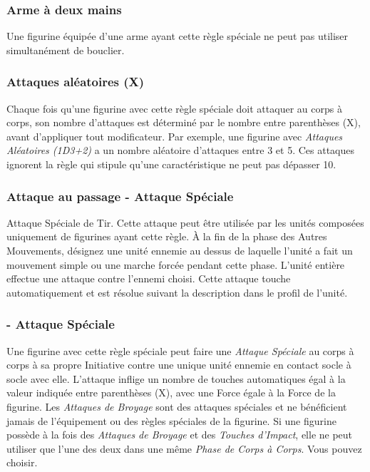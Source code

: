 \subsubsection*{Arme à deux mains}

Une figurine équipée d’une arme ayant cette règle spéciale ne peut pas utiliser simultanément de bouclier.


\subsubsection*{Attaques aléatoires (X)}

Chaque fois qu'une figurine avec cette règle spéciale doit attaquer au corps à corps, son nombre d'attaques est déterminé par le nombre entre parenthèses (X), avant d'appliquer tout modificateur. Par exemple, une figurine avec \emph{Attaques Aléatoires (1D3+2)} a un nombre aléatoire d'attaques entre 3 et 5. Ces attaques ignorent la règle qui stipule qu'une caractéristique ne peut pas dépasser 10.

\subsubsection*{Attaque au passage - Attaque Spéciale}

Attaque Spéciale de Tir. Cette attaque peut être utilisée par les unités composées uniquement de figurines ayant cette règle. À la fin de la phase des Autres Mouvements, désignez une unité ennemie  au dessus de laquelle l'unité a fait un mouvement simple ou une marche forcée pendant cette phase.  L'unité entière effectue une attaque contre l'ennemi choisi. Cette attaque touche automatiquement et est résolue suivant la description dans le profil de l'unité.

\subsubsection*{ - Attaque Spéciale}

Une figurine avec cette règle spéciale peut faire une \emph{Attaque Spéciale} au corps à corps à sa propre Initiative contre une unique unité ennemie en contact socle à socle avec elle. L'attaque inflige un nombre de touches automatiques égal à la valeur indiquée entre parenthèses (X), avec une Force égale à la Force de la figurine. Les \emph{Attaques de Broyage} sont des attaques spéciales et ne bénéficient jamais de l'équipement ou des règles spéciales de la figurine. Si une figurine possède à la fois des \emph{Attaques de Broyage} et des \emph{Touches d'Impact}, elle ne peut utiliser que l'une des deux dans une même \emph{Phase de Corps à Corps}. Vous pouvez choisir.

